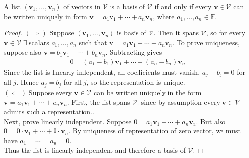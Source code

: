 \begin{proposition} A list $(\mathbf{v}_1, \ldots, \mathbf{v}_n)$ of vectors in $\mathcal{V}$ is a basis of $\mathcal{V}$ if and only if every $\mathbf{v} \in \mathcal{V}$ can be written uniquely in form $\mathbf{v} = a_1 \mathbf{v}_1 + \cdots + a_n \mathbf{v}_n $, where $a_1, \ldots, a_n \in \mathbb{F}$.
\begin{proof}
$(\Rightarrow)$ Suppose $(\mathbf{v}_1, \ldots, \mathbf{v}_n)$ is basis of $\mathcal{V}$. Then it spans $\mathcal{V}$, so for every $\mathbf{v} \in \mathcal{V} \ \exists$ scalars $a_1, \ldots, a_n$ such that $\mathbf{v} = a_1 \mathbf{v}_1 + \cdots + a_n \mathbf{v}_n$. To prove uniqueness, suppose also $\mathbf{v} = b_1 \mathbf{v}_1 + \cdots + b_n \mathbf{v}_n$. Subtracting gives
\begin{align}
0 = (a_1 - b_1) \mathbf{v}_1 + \cdots + (a_n - b_n) \mathbf{v}_n \nonumber
\end{align}
Since the list is linearly independent, all coefficients must vanish, $a_j - b_j = 0$ for all $j$. Hence $a_j = b_j$ for all $j$, so the representation is unique.\\
$(\Leftarrow)$ Suppose every $\mathbf{v} \in \mathcal{V}$ can be written uniquely in the form $\mathbf{v} = a_1 \mathbf{v}_1 + \cdots + a_n \mathbf{v}_n$. First, the list spans $\mathcal{V}$, since by assumption every $\mathbf{v} \in \mathcal{V}$ admits such a representation..\\
Next, prove linearly independent. Suppose $0 = a_1 \mathbf{v}_1 + \cdots + a_n \mathbf{v}_n$. But also $0 = 0 \cdot \mathbf{v}_1 + \cdots + 0 \cdot \mathbf{v}_n$. By uniqueness of representation of zero vector, we must have $a_1 = \cdots = a_n = 0$.\\
Thus the list is linearly independent and therefore a basis of $\mathcal{V}$.
\end{proof}
\end{proposition}

